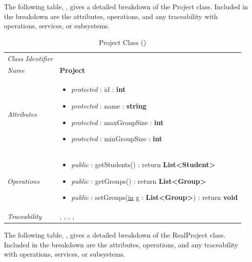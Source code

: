 \documentclass[12pt,letterpaper]{article}
\begin{document}
The following table, , gives a detailed breakdown of the Project class. Included in the breakdown are the attributes, operations, and any traceability with operations, services, or subsystems.

\begin{table}[H]
    \caption{Project Class ()} 
	\begin{tabu} to 
		\toprule
		Class Identifier &  \\
		Name & {\bf Project} \\
		Attributes & 
		\begin{minipage}[t]{\linewidth}
		    \begin{itemize}
		        \item \textit{protected} : id : {\bf int}
		        \item \textit{protected} : name : {\bf string}
		        \item \textit{protected} : maxGroupSize : {\bf int}
		        \item \textit{protected} : minGroupSize : {\bf int}
			\end{itemize}
	    \end{minipage} \\

		Operations &
		\begin{minipage}[t]{\linewidth}
			\begin{itemize}
			    \item {\it public} : getStudents() : return {\bf List<Student>}
			    \item {\it public} : getGroups() : return {\bf List<Group>}
			    \item {\it public} : setGroups(\underline{in} g : {\bf List<Group>}) : return {\bf void}
	        \end{itemize}
	    \end{minipage} \\
	    	Traceability & , , , , \\
		\toprule
	\end{tabu}
\end{table}

The following table, , gives a detailed breakdown of the RealProject class. Included in the breakdown are the attributes, operations, and any traceability with operations, services, or subsystems.
\end{document}
